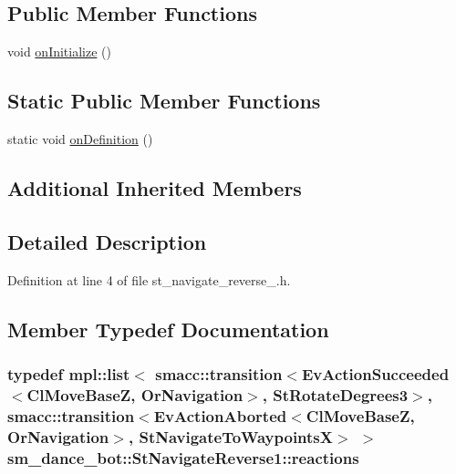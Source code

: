 \subsection*{Public Member Functions}
\begin{DoxyCompactItemize}
\item 
void \hyperlink{structsm__dance__bot_1_1StNavigateReverse1_accb981b02a307421a227dba807b64680}{on\+Initialize} ()
\end{DoxyCompactItemize}
\subsection*{Static Public Member Functions}
\begin{DoxyCompactItemize}
\item 
static void \hyperlink{structsm__dance__bot_1_1StNavigateReverse1_a612201aa6860794cad9c4be82c705233}{on\+Definition} ()
\end{DoxyCompactItemize}
\subsection*{Additional Inherited Members}


\subsection{Detailed Description}


Definition at line 4 of file st\+\_\+navigate\+\_\+reverse\+\_.\+h.



\subsection{Member Typedef Documentation}
\subsubsection[{\texorpdfstring{reactions}{reactions}}]{\setlength{\rightskip}{0pt plus 5cm}typedef mpl\+::list$<$ {\bf smacc\+::transition}$<$Ev\+Action\+Succeeded$<${\bf Cl\+Move\+BaseZ}, {\bf Or\+Navigation}$>$, {\bf St\+Rotate\+Degrees3}$>$, {\bf smacc\+::transition}$<$Ev\+Action\+Aborted$<${\bf Cl\+Move\+BaseZ}, {\bf Or\+Navigation}$>$, {\bf St\+Navigate\+To\+WaypointsX}$>$ $>$ {\bf sm\+\_\+dance\+\_\+bot\+::\+St\+Navigate\+Reverse1\+::reactions}}\hypertarget{structsm__dance__bot_1_1StNavigateReverse1_ad56d6535dba677953cee3fad9d47d52b}{}\label{structsm__dance__bot_1_1StNavigateReverse1_ad56d6535dba677953cee3fad9d47d52b}



